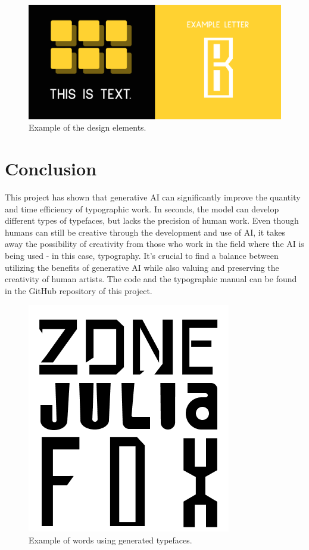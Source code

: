 \documentclass[11pt]{article}
\begin{document}
\begin{figure}[hbt!]
    \centering
    \includegraphics[width=0.75\columnwidth]{design.png}
    \caption{Example of the design elements.}
    \label{fig:design}
\end{figure}
\FloatBarrier

\section{Conclusion}
This project has shown that generative AI can significantly improve the quantity and time efficiency of typographic work. In seconds, the model can develop different types of typefaces, but lacks the precision of human work. Even though humans can still be creative through the development and use of AI, it takes away the possibility of creativity from those who work in the field where the AI is being used - in this case, typography. It's crucial to find a balance between utilizing the benefits of generative AI while also valuing and preserving the creativity of human artists.
The code and the typographic manual can be found in the GitHub repository \cite{fontGenerationGan} of this project.

\begin{figure}[hbt!]
    \centering
    \includegraphics[width=0.35\columnwidth]{font_examples.png}
    \caption{Example of words using generated typefaces.}
    \label{fig:font_examples}
\end{figure}
\FloatBarrier

\printbibliography
\end{document}
